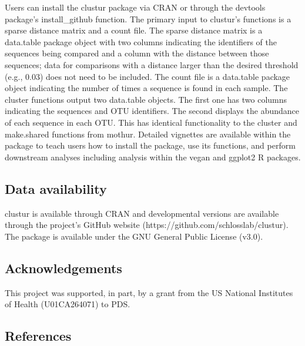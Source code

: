 \documentclass[
  11pt,
]{article}
\begin{document}
Users can install the clustur package via CRAN or through the devtools
package's install\_github function. The primary input to clustur's
functions is a sparse distance matrix and a count file. The sparse
distance matrix is a data.table package object with two columns
indicating the identifiers of the sequences being compared and a column
with the distance between those sequences; data for comparisons with a
distance larger than the desired threshold (e.g., 0.03) does not need to
be included. The count file is a data.table package object indicating
the number of times a sequence is found in each sample. The cluster
functions output two data.table objects. The first one has two columns
indicating the sequences and OTU identifiers. The second displays the
abundance of each sequence in each OTU. This has identical functionality
to the cluster and make.shared functions from mothur. Detailed vignettes
are available within the package to teach users how to install the
package, use its functions, and perform downstream analyses including
analysis within the vegan and ggplot2 R packages.

\subsection{Data availability}\label{data-availability}

clustur is available through CRAN and developmental versions are
available through the project's GitHub website
(https://github.com/schlosslab/clustur). The package is available under
the GNU General Public License (v3.0).

\subsection{Acknowledgements}\label{acknowledgements}

This project was supported, in part, by a grant from the US National
Institutes of Health (U01CA264071) to PDS.

\newpage

\subsection{References}\label{references}
\end{document}
